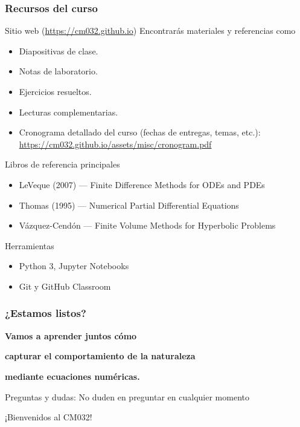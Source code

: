 \begin{frame}
	\frametitle{Recursos del curso}

	\begin{block}{Sitio web (\url{https://cm032.github.io})}
		Encontrarás materiales y referencias como
		\begin{itemize}
			\item Diapositivas de clase.
			\item Notas de laboratorio.
			\item Ejercicios resueltos.
			\item Lecturas complementarias.
			\item Cronograma detallado del curso (fechas de entregas, temas, etc.):  \url{https://cm032.github.io/assets/misc/cronogram.pdf}
		\end{itemize}
	\end{block}

	\begin{block}{Libros de referencia principales}
		\begin{itemize}
			\item LeVeque (2007) — Finite Difference Methods for ODEs and PDEs
			\item Thomas (1995) — Numerical Partial Differential Equations
			\item Vázquez-Cendón — Finite Volume Methods for Hyperbolic Problems
		\end{itemize}
	\end{block}

	\begin{block}{Herramientas}
		\begin{itemize}
			\item Python 3, Jupyter Notebooks
			\item Git y GitHub Classroom
		\end{itemize}
	\end{block}
\end{frame}

\begin{frame}
	\frametitle{¿Estamos listos?}

	\centering
	\vspace{1cm}

	{\Large \textbf{Vamos a aprender juntos cómo}}

	{\Large \textbf{capturar el comportamiento de la naturaleza}}

	{\Large \textbf{mediante ecuaciones numéricas.}}

	\vspace{1cm}

	{\large Preguntas y dudas: No duden en preguntar en cualquier momento}

	\vspace{1cm}

	¡Bienvenidos al CM032!
\end{frame}
